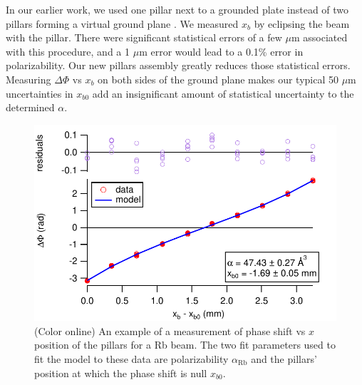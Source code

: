 \documentclass[twocolumn,prl,showpacs,superscriptaddress]{revtex4-1}   %
\newcommand{\arb}{\alpha_{\textrm{Rb}}}
\begin{document}
In our earlier work, we used one pillar next to a grounded plate instead of two pillars forming a virtual ground plane \cite{Holmgren2010}. We measured $x_b$ by eclipsing the beam with the pillar. There were significant statistical errors of a few $\mu$m associated with this procedure, and a 1 $\mu$m error would lead to a 0.1\% error in polarizability. 
Our new pillars assembly greatly reduces those statistical errors. Measuring $\Delta\Phi$ vs $x_b$ on both sides of the ground plane makes our typical 50 $\mu$m uncertainties in $x_{b0}$ add an insignificant amount of 
statistical uncertainty to the determined $\alpha$.

\begin{figure}
\includegraphics[width=\linewidth,keepaspectratio]{dPvMP_150327_q.pdf}
\caption{\label{dPvMPExample}(Color online) An example of a measurement of phase shift vs $x$ position of the pillars for a Rb beam. The two fit parameters used to fit the model to these data are polarizability $\arb$ and the pillars' position at which the phase shift is null $x_{b0}$.}
\end{figure}
\end{document}
